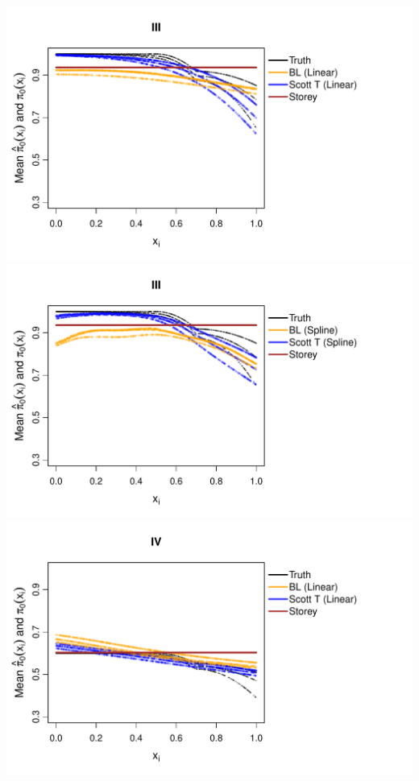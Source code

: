 \documentclass{article}\usepackage[]{graphicx}\usepackage[]{color}
\makeatletter
\def\maxwidth{ %
  \ifdim\Gin@nat@width>\linewidth
    \linewidth
  \else
    \Gin@nat@width
  \fi
}
\newenvironment{knitrout}{}{} %
\makeatother
\begin{document}
\begin{knitrout}
{\includegraphics[width=\maxwidth]{Figures/plot_of_mean_estimates_norm-4} 
\includegraphics[width=\maxwidth]{Figures/plot_of_mean_estimates_norm-5} 
\includegraphics[width=\maxwidth]{Figures/plot_of_mean_estimates_norm-6} 
}
\end{knitrout}
\end{document}

